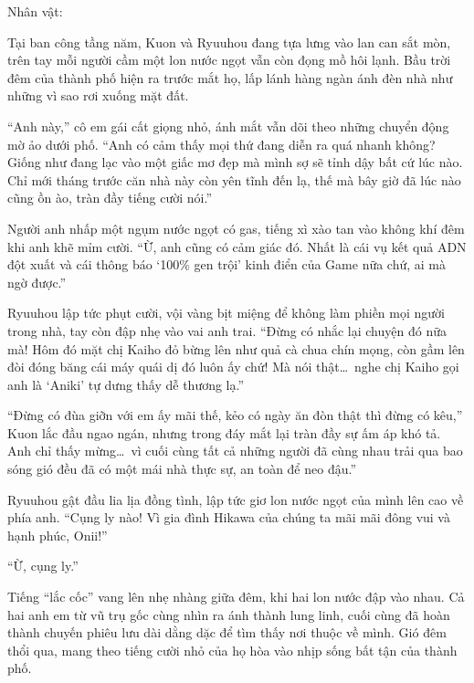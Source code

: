 \documentclass[../main.tex]{subfiles}
\begin{document}
\begin{center}
{\caviar\fontsize{12pt}{12pt}\selectfont Nhân vật:  }
\end{center}

Tại ban công tầng năm, Kuon và Ryuuhou đang tựa lưng vào lan can sắt mòn, trên tay mỗi người cầm một lon nước ngọt vẫn còn đọng mồ hôi lạnh. Bầu trời đêm của thành phố hiện ra trước mắt họ, lấp lánh hàng ngàn ánh đèn nhà như những vì sao rơi xuống mặt đất.

``Anh này,'' cô em gái cất giọng nhỏ, ánh mắt vẫn dõi theo những chuyển động mờ ảo dưới phố. ``Anh có cảm thấy mọi thứ đang diễn ra quá nhanh không? Giống như đang lạc vào một giấc mơ đẹp mà mình sợ sẽ tỉnh dậy bất cứ lúc nào. Chỉ mới tháng trước căn nhà này còn yên tĩnh đến lạ, thế mà bây giờ đã lúc nào cũng ồn ào, tràn đầy tiếng cười nói.''

Người anh nhấp một ngụm nước ngọt có gas, tiếng xì xào tan vào không khí đêm khi anh khẽ mỉm cười. ``Ừ, anh cũng có cảm giác đó. Nhất là cái vụ kết quả ADN đột xuất và cái thông báo `100\% gen trội' kinh điển của Game nữa chứ, ai mà ngờ được.''

Ryuuhou lập tức phụt cười, vội vàng bịt miệng để không làm phiền mọi người trong nhà, tay còn đập nhẹ vào vai anh trai. ``Đừng có nhắc lại chuyện đó nữa mà! Hôm đó mặt chị Kaiho đỏ bừng lên như quả cà chua chín mọng, còn gầm lên đòi đóng băng cái máy quái dị đó luôn ấy chứ! Mà nói thật\dots\ nghe chị Kaiho gọi anh là `Aniki' tự dưng thấy dễ thương lạ.''

``Đừng có đùa giỡn với em ấy mãi thế, kẻo có ngày ăn đòn thật thì đừng có kêu,'' Kuon lắc đầu ngao ngán, nhưng trong đáy mắt lại tràn đầy sự ấm áp khó tả. Anh chỉ thấy mừng\dots\ vì cuối cùng tất cả những người đã cùng nhau trải qua bao sóng gió đều đã có một mái nhà thực sự, an toàn để neo đậu.''

Ryuuhou gật đầu lia lịa đồng tình, lập tức giơ lon nước ngọt của mình lên cao về phía anh. ``Cụng ly nào! Vì gia đình Hikawa của chúng ta mãi mãi đông vui và hạnh phúc, Onii!''

``Ừ, cụng ly.''

Tiếng ``lắc cốc'' vang lên nhẹ nhàng giữa đêm, khi hai lon nước đập vào nhau. Cả hai anh em từ vũ trụ gốc cùng nhìn ra ánh thành lung linh, cuối cùng đã hoàn thành chuyến phiêu lưu dài dằng dặc để tìm thấy nơi thuộc về mình. Gió đêm thổi qua, mang theo tiếng cười nhỏ của họ hòa vào nhịp sống bất tận của thành phố.
\end{document}
